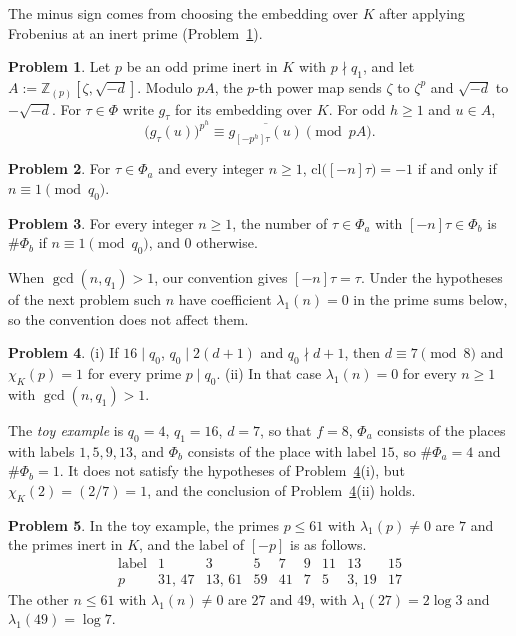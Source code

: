 \documentclass[reqno]{amsart}
\theoremstyle{definition}
\newtheorem{problem}{Problem}[section]
\theoremstyle{plain}
\newcommand{\Z}{\mathbb{Z}}
\begin{document}
The minus sign comes from choosing the embedding over \(K\) after applying Frobenius at an inert prime (Problem~\ref{pr:frobenius-partner}).

\begin{problem}\label{pr:frobenius-partner}
Let \(p\) be an odd prime inert in \(K\) with \(p \nmid q_1\), and let \(A := \Z_{(p)}[\zeta,\sqrt{-d}]\).  Modulo \(pA\), the \(p\)-th power map sends \(\zeta\) to \(\zeta^p\) and \(\sqrt{-d}\) to \(-\sqrt{-d}\).  For \(\tau \in \Phi\) write \(g_\tau\) for its embedding over \(K\).  For odd \(h \ge 1\) and \(u \in A\),
\[
  \bigl(g_\tau(u)\bigr)^{p^h} \equiv \overline{g_{[-p^h]\tau}(u)} \pmod{pA}.
\]
\end{problem}

\begin{problem}\label{pr:outside}
For \(\tau \in \Phi_a\) and every integer \(n \ge 1\), \(\mathrm{cl}\bigl([-n]\tau\bigr) = -1\) if and only if \(n \equiv 1 \pmod{q_0}\).
\end{problem}

\begin{problem}\label{pr:count}
For every integer \(n \ge 1\), the number of \(\tau \in \Phi_a\) with \([-n]\tau \in \Phi_b\) is \(\#\Phi_b\) if \(n \equiv 1 \pmod{q_0}\), and \(0\) otherwise.
\end{problem}

When \(\gcd(n, q_1) > 1\), our convention gives \([-n]\tau = \tau\).  Under the hypotheses of the next problem such \(n\) have coefficient \(\lambda_1(n) = 0\) in the prime sums below, so the convention does not affect them.

\begin{problem}\label{pr:coef}
(i) If \(16 \mid q_0\), \(q_0 \mid 2(d + 1)\) and \(q_0 \nmid d + 1\), then \(d \equiv 7 \pmod 8\) and \(\chi_K(p) = 1\) for every prime \(p \mid q_0\).
(ii) In that case \(\lambda_1(n) = 0\) for every \(n \ge 1\) with \(\gcd(n, q_1) > 1\).
\end{problem}

The \emph{toy example} is \(q_0 = 4\), \(q_1 = 16\), \(d = 7\), so that \(f = 8\), \(\Phi_a\) consists of the places with labels \(1, 5, 9, 13\), and \(\Phi_b\) consists of the place with label \(15\), so \(\#\Phi_a = 4\) and \(\#\Phi_b = 1\).  It does not satisfy the hypotheses of Problem~\ref{pr:coef}(i), but \(\chi_K(2) = (2/7) = 1\), and the conclusion of Problem~\ref{pr:coef}(ii) holds.

\begin{problem}\label{pr:table}
In the toy example, the primes \(p \le 61\) with \(\lambda_1(p) \ne 0\) are \(7\) and the primes inert in \(K\), and the label of \([-p]\) is as follows.
\[
  \begin{array}{c|cccccccc}
    \text{label} & 1 & 3 & 5 & 7 & 9 & 11 & 13 & 15 \\ \hline
    p & 31,\, 47 & 13,\, 61 & 59 & 41 & 7 & 5 & 3,\, 19 & 17
  \end{array}
\]
The other \(n \le 61\) with \(\lambda_1(n) \ne 0\) are \(27\) and \(49\), with \(\lambda_1(27) = 2\log 3\) and \(\lambda_1(49) = \log 7\).
\end{problem}
\end{document}
